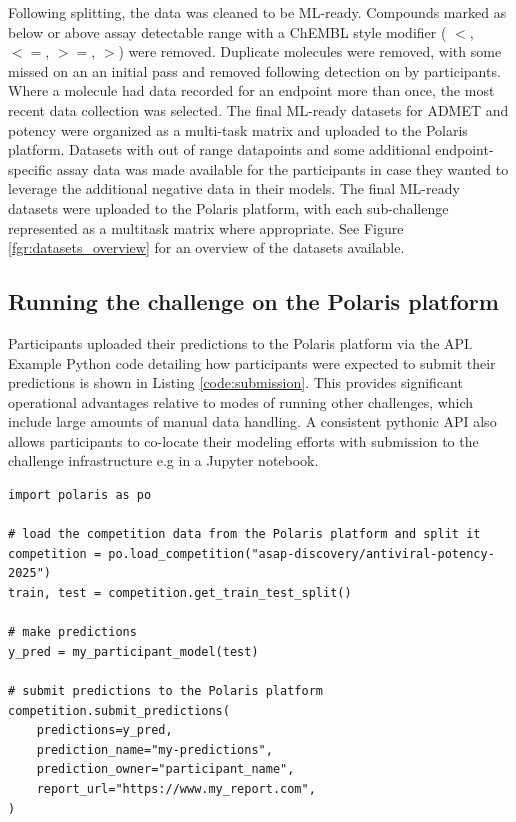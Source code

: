 \documentclass[journal=jcim,manuscript=article]{achemso}
\newenvironment{code}{\captionsetup{type=listing}}{}
\begin{document}
Following splitting, the data was cleaned to be ML-ready. Compounds marked as below or above assay detectable range with a ChEMBL style modifier ( $<$, $<=$, $>=$, $>$) were removed. Duplicate molecules were removed, with some missed on an an initial pass and removed following detection on by participants. Where a molecule had data recorded for an endpoint more than once, the most recent data collection was selected. The final ML-ready datasets for ADMET and potency were organized as a multi-task matrix and uploaded to the Polaris platform. Datasets with out of range datapoints and some additional endpoint-specific assay data was made available for the participants in case they wanted to leverage the additional negative data in their models. The final ML-ready datasets were uploaded to the Polaris platform, with each sub-challenge represented as a multitask matrix where appropriate. See Figure \ref{fgr:datasets_overview} for an overview of the datasets available. 


\subsection{Running the challenge on the Polaris platform}

Participants uploaded their predictions to the Polaris platform via the API. Example Python code detailing how participants were expected to submit their predictions is shown in Listing \ref{code:submission}. This provides significant operational advantages relative to modes of running other challenges, which include large amounts of manual data handling. A consistent pythonic API also allows participants to co-locate their modeling efforts with submission to the challenge infrastructure e.g in a Jupyter notebook.

\begin{code}
\label{code:submission}
\begin{verbatim}
import polaris as po

# load the competition data from the Polaris platform and split it
competition = po.load_competition("asap-discovery/antiviral-potency-2025")
train, test = competition.get_train_test_split()

# make predictions
y_pred = my_participant_model(test)

# submit predictions to the Polaris platform
competition.submit_predictions(
    predictions=y_pred,
    prediction_name="my-predictions",
    prediction_owner="participant_name",
    report_url="https://www.my_report.com",
)
\end{verbatim}
\end{code}
\end{document}
